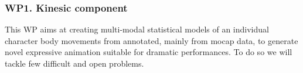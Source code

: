 
\subsubsection{WP1. Kinesic component} 




This WP aims at creating multi-modal statistical models of an individual character body movements from annotated, mainly from mocap data, to generate novel expressive animation suitable for dramatic performances. To do so we will tackle few difficult and open problems. 

